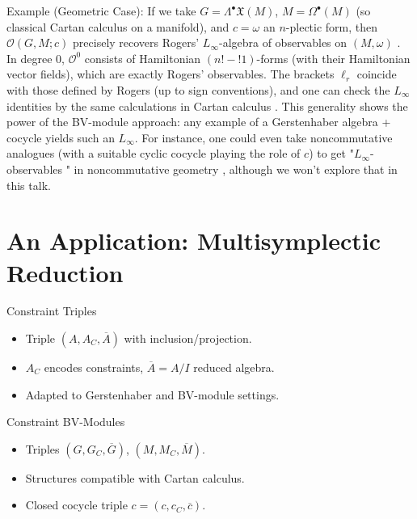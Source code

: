 \documentclass[handout,10pt]{beamer}
\begin{document}
{    Example (Geometric Case): If we take $G = \Lambda^\bullet \mathfrak X(M)$, $M = \Omega^\bullet(M)$ (so classical Cartan calculus on a manifold), and $c = \omega$ an $n$-plectic form, then $\mathcal{O}(G,M;c)$ precisely recovers Rogers’ $L_\infty$-algebra of observables on $(M,\omega)$  . In degree 0, $\mathcal{O}^0$ consists of Hamiltonian $(n!-!1)$-forms (with their Hamiltonian vector fields), which are exactly Rogers’ observables. The brackets $\ell_r$ coincide with those defined by Rogers (up to sign conventions), and one can check the $L_\infty$ identities by the same calculations in Cartan calculus . This generality shows the power of the BV-module approach: any example of a Gerstenhaber algebra + cocycle yields such an $L_\infty$. For instance, one could even take noncommutative analogues (with a suitable cyclic cocycle playing the role of $c$) to get  "$L_\infty$-observables " in noncommutative geometry  , although we won’t explore that in this talk.}


%
\section{An Application: Multisymplectic Reduction}
%

\begin{frame}{Constraint Triples}
\begin{itemize}
  \item Triple $(A, A_C, \overline{A})$ with inclusion/projection.
  \item $A_C$ encodes constraints, $\overline{A} = A/I$ reduced algebra.
  \item Adapted to Gerstenhaber and BV-module settings.
\end{itemize}
\end{frame}

\begin{frame}{Constraint BV-Modules}
\begin{itemize}
  \item Triples $(G, G_C, \overline{G})$, $(M, M_C, \overline{M})$.
  \item Structures compatible with Cartan calculus.
  \item Closed cocycle triple $c = (c, c_C, \overline{c})$.
\end{itemize}
\end{frame}
\end{document}
